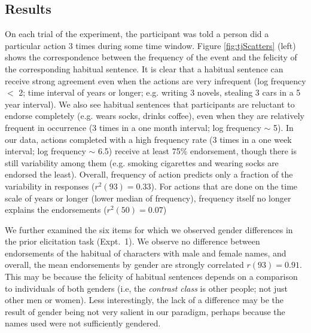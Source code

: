 \documentclass[10pt,letterpaper]{article}
\begin{document}
\subsection{Results}
On each trial of the experiment, the participant was told a person did a particular action 3 times during some time window. 
Figure \ref{fig:tjScatters} (left) shows the correspondence between the frequency of the event and the felicity of the corresponding habitual sentence. 
It is clear that a habitual sentence can receive strong agreement even when the actions are very infrequent (log frequency $<$ 2; time interval of years or longer; e.g. writing 3 novels, stealing 3 cars in a 5 year interval).
We also see habitual sentences that participants are reluctant to endorse completely (e.g. wears socks, drinks coffee), even when they are relatively frequent in occurrence (3 times in a one month interval; log frequency $\sim$ 5).
In our data, actions completed with a high frequency rate (3 times in a one week interval; log frequency $\sim$ 6.5) receive at least 75\% endorsement, though there is still variability among them (e.g. smoking cigarettes and wearing socks are endorsed the least). %
Overall, frequency of action predicts only a fraction of the variability in responses ($r^2(93) = 0.33$).
For actions that are done on the time scale of years or longer (lower median of frequency), frequency itself no longer explains the endorsements ($r^2(50) = 0.07$)

We further examined the six items for which we observed gender differences in the prior elicitation task (Expt.~1).
We observe no difference between endorsements of the habitual of characters with male and female names, and overall, the mean endorsements by gender are strongly correlated $r(93) = 0.91$. 
This may be because the felicity of habitual sentences depends on a comparison to individuals of both genders (i.e, the \emph{contrast class} is other people; not just other men or women). 
Less interestingly, the lack of a difference may be the result of gender being not very salient in our paradigm, perhaps because the names used were not sufficiently gendered.
\end{document}
